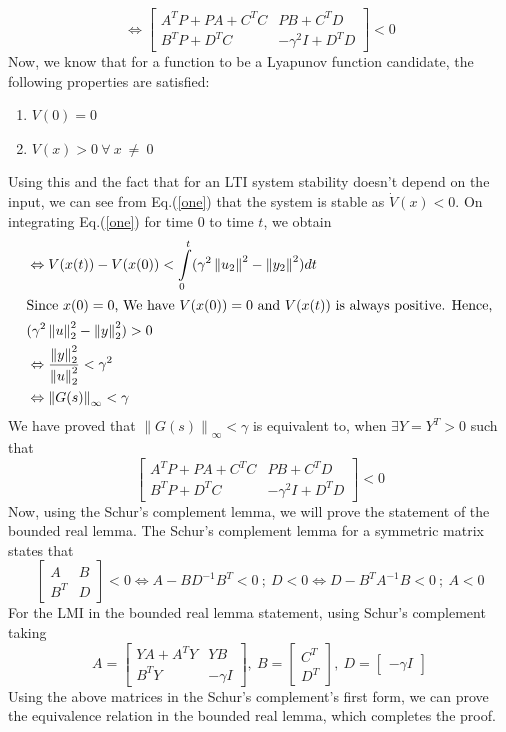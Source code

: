 \documentclass[a4paper,12pt]{article}
\newcommand\norm[1]{\left\lVert#1\right\rVert}
\begin{document}
		\[
		\Leftrightarrow
		\begin{bmatrix}
		A^{T}P+PA+C^{T}C & PB+C^{T}D \\
		B^{T}P+D^{T}{C} & -\gamma^{2} I + D^{T}D
		\end{bmatrix}
		< 0
		\]
		Now, we know that for a function to be a Lyapunov function candidate, the following properties are satisfied:
		\begin{enumerate}
		\label{ly}
		\item $V(0)=0$ 
		\item $V(x)>0\: \forall\: x\:\neq\:0$
		\end{enumerate}Using this and the fact that for an LTI system stability doesn't depend on the input, we can see from Eq.(\ref{one}) that the system is stable as $\dot{V}(x) < 0$. On integrating Eq.(\ref{one}) for time $0$ to time $t$, we obtain
		\begin{align}
		&\Leftrightarrow V(x(t))-V(x(0)) < \int\limits_{0}^{t} (\gamma^{2}\norm{{u}_{2}}^{2} - \norm{{y}_{2}}^{2}) dt\\
		\intertext{Since $x(0)=0$, We have $V(x(0))=0$ and $V(x(t))$ is always positive. Hence,}
		&(\gamma^{2}\norm{u}_{2}^{2} - \norm{y}_{2}^{2}) > 0\\
		&\Leftrightarrow\frac{\norm{y}_{2}^{2}}{\norm{u}_{2}^{2}} < \gamma^{2}\\
		&\Leftrightarrow\norm{G(s)}_{\infty} < \gamma
		\end{align}
		We have proved that $\norm{G(s)}_{\infty} < \gamma$ is equivalent to, when $\exists Y=Y^{T} > 0$ such that 
		\[		
		\begin{bmatrix}
		A^{T}P+PA+C^{T}C & PB+C^{T}D \\
		B^{T}P+D^{T}{C} & -\gamma^{2} I + D^{T}D
		\end{bmatrix}
		< 0
		\]
		Now, using the Schur's complement lemma, we will prove the statement of the bounded real lemma. The Schur's complement lemma for a symmetric matrix states that
		\[
		\begin{bmatrix}
		A & B \\ B^{T} & D
		\end{bmatrix}
		< 0
		\Leftrightarrow
		A-BD^{-1}B^{T} < 0\: ; \:D < 0
		\Leftrightarrow
		D-B^{T}A^{-1}B < 0 \: ; \: A < 0
		\]
		For the LMI in the bounded real lemma statement, using Schur's complement taking 
		\[
		A=
		\begin{bmatrix}
		YA+A^{T}Y & YB \\
		B^{T}Y & -\gamma I 
		\end{bmatrix}
		,\:B=
		\begin{bmatrix}
		 C^{T} \\
		D^{T}
		\end{bmatrix}
		,\:D=
		\begin{bmatrix}
		-\gamma I
		\end{bmatrix}
		\]
		Using the above matrices in the Schur's complement's first form, we can prove the equivalence relation in the bounded real lemma, which completes the proof. 
\end{document}
